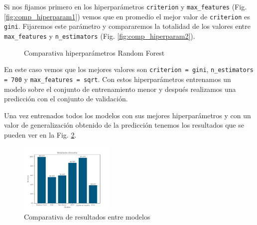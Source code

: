 Si nos fijamos primero en los hiperparámetros \texttt{criterion} y \texttt{max\_features} (Fig. \ref{fig:comp_hiperparam1}) vemos que en promedio el mejor valor de \texttt{criterion} es \texttt{gini}. Fijaremos este parámetro y compararemos la totalidad de los valores entre \texttt{max\_features} y \texttt{n\_estimators} (Fig. \ref{fig:comp_hiperparam2}).

\begin{figure}
    \centering
    \quad
    \caption{Comparativa hiperparámetros Random Forest}
    \label{fig:comp_hiperparam}
\end{figure}

En este caso vemos que los mejores valores son \texttt{criterion = gini}, \texttt{n\_estimators = 700} y \texttt{max\_features = sqrt}. Con estos hiperparámetros entrenamos un modelo sobre el conjunto de entrenamiento menor y después realizamos una predicción con el conjunto de validación.

Una vez entrenados todos los modelos con sus mejores hiperparámetros y con un valor de generalización obtenido de la predicción tenemos los resultados que se pueden ver en la Fig. \ref{fig:comp_accur}.

\begin{figure}
    \centering
    \includegraphics[width=0.4\textwidth]{../Python/plots/parallel/accur_results}
    \caption{Comparativa de resultados entre modelos}
    \label{fig:comp_accur}
\end{figure}

